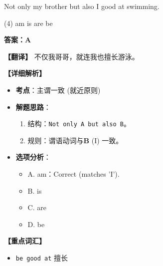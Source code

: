 \documentclass[11pt, a4paper]{article}
\newcommand{\analysis}[4]{
    \begin{solutionbox}
        \textbf{答案：#1}
        
        \textbf{【翻译】} #2
        
        \textbf{【详细解析】}
        #3
        
        \textbf{【重点词汇】}
        #4
    \end{solutionbox}
}
\newcommand{\blank}{\underline{\hspace{1.5cm}}}
\begin{document}
\begin{questions}
    \item Not only my brother but also I \blank good at swimming.
    \begin{tasks}(4)
        \task am \task is \task are \task be
    \end{tasks}
    \analysis{A}{不仅我哥哥，就连我也擅长游泳。}{
        \begin{itemize}
            \item \textbf{考点}：主谓一致 (就近原则)
            \item \textbf{解题思路}：
                \begin{enumerate}
                    \item 结构：\texttt{Not only A but also B}。
                    \item 规则：谓语动词与\textbf{B} (I) 一致。
                \end{enumerate}
            \item \textbf{选项分析}：
                \begin{itemize}
                    \item A. am：Correct (matches 'I').
                    \item B. is
                    \item C. are
                    \item D. be
                \end{itemize}
        \end{itemize}
    }{
        \begin{itemize}
            \item \texttt{be good at} 擅长
        \end{itemize}
    }


\end{questions}
\end{document}
